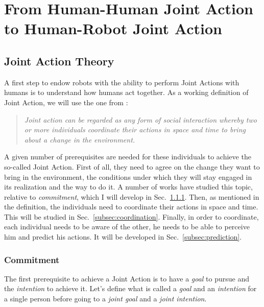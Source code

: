 \documentclass[english,a4paper,11pt,twoside]{StyleThese}
\begin{document}
\setcounter{chapter}{0} %
\dominitoc
\faketableofcontents
\fi

\chapter{From Human-Human Joint Action to Human-Robot Joint Action}
\minitoc

\label{ch:biblio}

\section{Joint Action Theory}

A first step to endow robots with the ability to perform Joint Actions with humans is to understand how humans act together. As a working definition of Joint Action, we will use the one from \cite{sebanz2006joint}:

\begin{quote}
\textit{Joint action can be regarded as any form of social interaction whereby two or more individuals coordinate their actions in space and time to bring about a change in the environment.}
\end{quote}

A given number of prerequisites are needed for these individuals to achieve the so-called Joint Action. First of all, they need to agree on the change they want to bring in the environment, the conditions under which they will stay engaged in its realization and the way to do it. A number of works have studied this topic, relative to \textit{commitment}, which I will develop in Sec.~\ref{subsec:commitment}. Then, as mentioned in the definition, the individuals need to coordinate their actions in space and time. This will be studied in Sec.~\ref{subsec:coordination}. Finally, in order to coordinate, each individual needs to be aware of the other, he needs to be able to perceive him and predict his actions. It will be developed in Sec.~\ref{subsec:prediction}.

\subsection{Commitment}

\label{subsec:commitment}

The first prerequisite to achieve a Joint Action is to have a \textit{goal} to pursue and the \textit{intention} to achieve it. Let's define what is called a \textit{goal} and an \textit{intention} for a single person before going to a \textit{joint goal} and a \textit{joint intention}.
\end{document}

